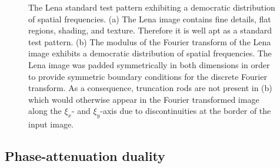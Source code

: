 \documentclass[
twoside,
openright,
titlepage,
numbers=noenddot,
headinclude,
fleqn,
a4paper,
footinclude=true,
cleardoublepage=empty,
abstractoff,
BCOR=5mm,
paper=a4,
fontsize=11pt,
british,ngerman,american,
]{scrreprt}
\begin{document}
\begin{figure}
  \centering
  \hspace{1cm}
  \caption[Lena test pattern and its Fourier transform.]{The Lena
    standard test pattern exhibiting a democratic distribution of
    spatial frequencies.  (a) The Lena image contains fine details,
    flat regions, shading, and texture.  Therefore it is well apt as a
    standard test pattern. (b) The modulus of the Fourier transform of
    the Lena image exhibits a democratic distribution of spatial
    frequencies.  The Lena image was padded symmetrically in both
    dimensions in order to provide symmetric boundary conditions for
    the discrete Fourier transform.  As a consequence, truncation rods
    are not present in (b) which would otherwise appear in the Fourier
    transformed image along the $\xi_x$- and $\xi_y$-axis due to 
    discontinuities at the border of the input image.}
  \label{fig:phantom-lena}
\end{figure}

\subsection{Phase-attenuation duality}
\label{sec:duality}
\end{document}

